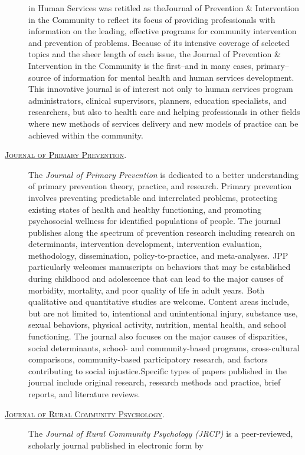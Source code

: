 \documentclass[]{tufte-handout}
\begin{document}
\begin{description}
in Human Services was retitled as theJournal of Prevention \&
Intervention in the Community to reflect its focus of providing
professionals with information on the leading, effective programs for
community intervention and prevention of problems. Because of its
intensive coverage of selected topics and the sheer length of each
issue, the Journal of Prevention \& Intervention in the Community is the
first--and in many cases, primary--source of information for mental
health and human services development. This innovative journal is of
interest not only to human services program administrators, clinical
supervisors, planners, education specialists, and researchers, but also
to health care and helping professionals in other fields where new
methods of services delivery and new models of practice can be achieved
within the community.
\item[\href{http://link.springer.com/journal/10935}{\textsc{Journal of Primary Prevention}}.]
The \emph{Journal of Primary Prevention} is dedicated to a better
understanding of primary prevention theory, practice, and research.
Primary prevention involves preventing predictable and interrelated
problems, protecting existing states of health and healthy functioning,
and promoting psychosocial wellness for identified populations of
people. The journal publishes along the spectrum of prevention research
including research on determinants, intervention development,
intervention evaluation, methodology, dissemination, policy-to-practice,
and meta-analyses. JPP particularly welcomes manuscripts on behaviors
that may be established during childhood and adolescence that can lead
to the major causes of morbidity, mortality, and poor quality of life in
adult years. Both qualitative and quantitative studies are welcome.
Content areas include, but are not limited to, intentional and
unintentional injury, substance use, sexual behaviors, physical
activity, nutrition, mental health, and school functioning. The journal
also focuses on the major causes of disparities, social determinants,
school- and community-based programs, cross-cultural comparisons,
community-based participatory research, and factors contributing to
social injustice.Specific types of papers published in the journal
include original research, research methods and practice, brief reports,
and literature reviews.
\item[\href{http://www.marshall.edu/jrcp/}{\textsc{Journal of Rural Community Psychology}}.]
The \emph{Journal of Rural Community Psychology (JRCP)} is a
peer-reviewed, scholarly journal published in electronic form by

\end{description}
\end{document}
